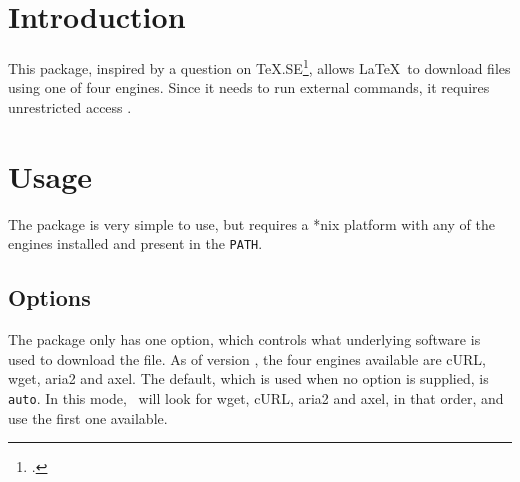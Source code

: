 \documentclass{skdoc}
\begin{document}

    \author{Simon Sigurdhsson}

    \maketitle
    \begin{abstract}
        The \thepackage\ package allows \LaTeX\ to download files using
        cURL, wget, aria2 or axel.
    \end{abstract}

    \section{Introduction}
    This package, inspired by a question on \TeX.SE\footcite{Klinger12},
    allows \LaTeX\ to download files using one of four engines.
    Since it needs
    to run external commands, it requires unrestricted 
    access .

    \section{Usage}
    The package is very simple to use, but requires a *nix platform with
    any of the engines installed and present in the \texttt{PATH}.

    \subsection{Options}
    The package only has one option, which controls what underlying
    software is used to download the file. As of version \theversion,
    the four engines available are cURL, wget, aria2 and axel.
    The default, which is
    used when no option is supplied, is \texttt{auto}. In this mode,
    \thepkg\ will look for wget, cURL, aria2 and axel, in that order,
    and use the first one available.
\end{document}
